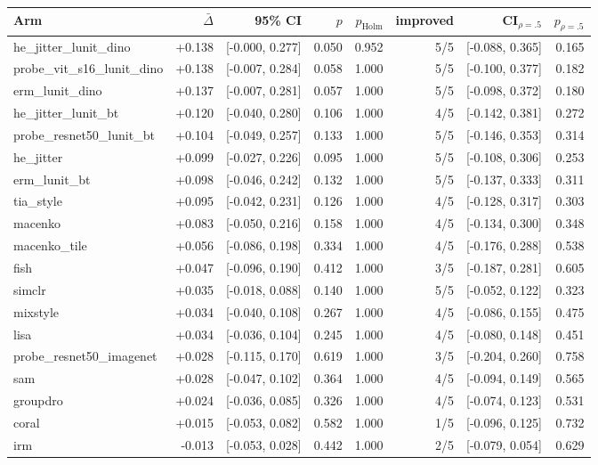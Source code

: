 \begin{tabular}{lrrrrrrr}
\toprule
Arm & $\bar\Delta$ & 95\% CI & $p$ & $p_\text{Holm}$ & improved & CI$_{\rho=.5}$ & $p_{\rho=.5}$ \\
\midrule
he\_jitter\_lunit\_dino & +0.138 & [-0.000, 0.277] & 0.050 & 0.952 & 5/5 & [-0.088, 0.365] & 0.165 \\
probe\_vit\_s16\_lunit\_dino & +0.138 & [-0.007, 0.284] & 0.058 & 1.000 & 5/5 & [-0.100, 0.377] & 0.182 \\
erm\_lunit\_dino & +0.137 & [-0.007, 0.281] & 0.057 & 1.000 & 5/5 & [-0.098, 0.372] & 0.180 \\
he\_jitter\_lunit\_bt & +0.120 & [-0.040, 0.280] & 0.106 & 1.000 & 4/5 & [-0.142, 0.381] & 0.272 \\
probe\_resnet50\_lunit\_bt & +0.104 & [-0.049, 0.257] & 0.133 & 1.000 & 5/5 & [-0.146, 0.353] & 0.314 \\
he\_jitter & +0.099 & [-0.027, 0.226] & 0.095 & 1.000 & 5/5 & [-0.108, 0.306] & 0.253 \\
erm\_lunit\_bt & +0.098 & [-0.046, 0.242] & 0.132 & 1.000 & 5/5 & [-0.137, 0.333] & 0.311 \\
tia\_style & +0.095 & [-0.042, 0.231] & 0.126 & 1.000 & 4/5 & [-0.128, 0.317] & 0.303 \\
macenko & +0.083 & [-0.050, 0.216] & 0.158 & 1.000 & 4/5 & [-0.134, 0.300] & 0.348 \\
macenko\_tile & +0.056 & [-0.086, 0.198] & 0.334 & 1.000 & 4/5 & [-0.176, 0.288] & 0.538 \\
fish & +0.047 & [-0.096, 0.190] & 0.412 & 1.000 & 3/5 & [-0.187, 0.281] & 0.605 \\
simclr & +0.035 & [-0.018, 0.088] & 0.140 & 1.000 & 5/5 & [-0.052, 0.122] & 0.323 \\
mixstyle & +0.034 & [-0.040, 0.108] & 0.267 & 1.000 & 4/5 & [-0.086, 0.155] & 0.475 \\
lisa & +0.034 & [-0.036, 0.104] & 0.245 & 1.000 & 4/5 & [-0.080, 0.148] & 0.451 \\
probe\_resnet50\_imagenet & +0.028 & [-0.115, 0.170] & 0.619 & 1.000 & 3/5 & [-0.204, 0.260] & 0.758 \\
sam & +0.028 & [-0.047, 0.102] & 0.364 & 1.000 & 4/5 & [-0.094, 0.149] & 0.565 \\
groupdro & +0.024 & [-0.036, 0.085] & 0.326 & 1.000 & 4/5 & [-0.074, 0.123] & 0.531 \\
coral & +0.015 & [-0.053, 0.082] & 0.582 & 1.000 & 1/5 & [-0.096, 0.125] & 0.732 \\
irm & -0.013 & [-0.053, 0.028] & 0.442 & 1.000 & 2/5 & [-0.079, 0.054] & 0.629 \\
\bottomrule
\end{tabular}
